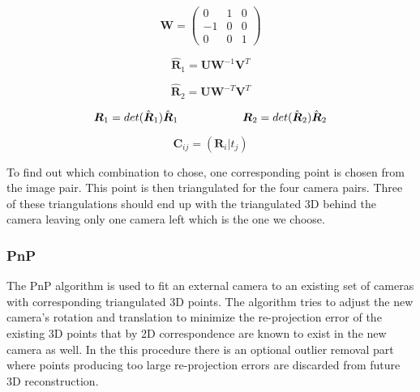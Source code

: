 \begin{equation}
\boldsymbol{W} = 	\begin{pmatrix}
					0  & 1 & 0 \\
					-1 & 0 & 0 \\
					0  & 0 & 1
					\end{pmatrix}
\end{equation}

\begin{equation}
\hat{\boldsymbol{R}}_1 = \boldsymbol{U W }^{-1} \boldsymbol{V}^T
\end{equation}

\begin{equation}
\hat{\boldsymbol{R}}_2 = \boldsymbol{U W }^{-T} \boldsymbol{V}^T
\end{equation}

\begin{equation}
\boldsymbol{R}_1 = det(\hat{\boldsymbol{R}}_1) \hat{\boldsymbol{R}}_1 
\hspace{2 cm}
\boldsymbol{R}_2 = det(\hat{\boldsymbol{R}}_2) \hat{\boldsymbol{R}}_2
\end{equation}

\begin{equation}
\boldsymbol{C}_{ij} = (\boldsymbol{R}_i | t_j)
\end{equation}

To find out which combination to chose, one corresponding point is chosen from the image pair. This point is then triangulated for the four camera pairs. Three of these triangulations should end up with the triangulated 3D behind the camera leaving only one camera left which is the one we choose. 

\subsubsection{PnP}
The PnP algorithm is used to fit an external camera to an existing set of cameras with corresponding triangulated 3D points. The algorithm tries to adjust the new camera's rotation and translation to minimize the re-projection error of the existing 3D points that by 2D correspondence are known to exist in the new camera as well. In the this procedure there is an optional outlier removal part where points producing too large re-projection errors are discarded from future 3D reconstruction. 